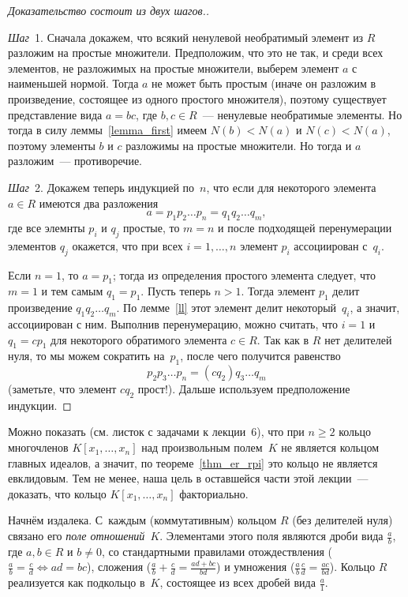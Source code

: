 \documentclass[a4paper,10pt]{amsart}
\theoremstyle{definition}
\theoremstyle{remark}
\begin{document}
\begin{proof}[Доказательство \textup{состоит из двух шагов.}]~

\textit{Шаг}~1. Сначала докажем, что всякий ненулевой необратимый
элемент из $R$ разложим на простые множители. Предположим, что это
не так, и среди всех элементов, не разложимых на простые множители,
выберем элемент $a$ с наименьшей нормой. Тогда $a$ не может быть
простым (иначе он разложим в произведение, состоящее из одного
простого множителя), поэтому существует представление вида $a = bc$,
где $b,c \in R$~--- ненулевые необратимые элементы. Но тогда в силу
леммы~\ref{lemma_first} имеем $N(b) < N(a)$ и $N(c) < N(a)$, поэтому
элементы $b$ и $c$ разложимы на простые множители. Но тогда и $a$
разложим~--- противоречие.

\textit{Шаг}~2. Докажем теперь индукцией по~$n$, что если для
некоторого элемента $a \in R$ имеются два разложения
$$
a = p_1p_2\ldots p_n=q_1q_2\ldots q_m,
$$
где все элемнты $p_i$ и $q_j$ простые, то $m=n$ и после подходящей
перенумерации элементов $q_j$ окажется, что при всех $i = 1,\ldots,
n$ элемент $p_i$ ассоциирован с~$q_i$.

Если $n=1$, то $a = p_1$; тогда из определения простого элемента
следует, что $m = 1$ и тем самым $q_1 = p_1$. Пусть теперь $n > 1$.
Тогда элемент $p_1$ делит произведение $q_1 q_2 \ldots q_m$. По
лемме~\ref{ll} этот элемент делит некоторый~$q_i$, а значит,
ассоциирован с ним. Выполнив перенумерацию, можно считать, что $i =
1$ и $q_1 = cp_1$ для некоторого обратимого элемента $c \in R$. Так
как в $R$ нет делителей нуля, то мы можем сократить на~$p_1$, после
чего получится равенство
$$
p_2 p_3 \ldots p_n = (cq_2)q_3 \ldots q_m
$$
(заметьте, что элемент $cq_2$ прост!). Дальше используем
предположение индукции.
\end{proof}

Можно показать (см. листок с задачами к лекции~6), что при $n
\geqslant 2$ кольцо многочленов $K[x_1, \ldots, x_n]$ над
произвольным полем~$K$ не является кольцом главных идеалов, а
значит, по теореме~\ref{thm_er_rpi} это кольцо не является
евклидовым. Тем не менее, наша цель в оставшейся части этой
лекции~--- доказать, что кольцо $K[x_1, \ldots, x_n]$ факториально.

Начнём издалека. С~каждым (коммутативным) кольцом $R$ (без делителей
нуля) связано его \textit{поле отношений}~$K$. Элементами этого поля
являются дроби вида $\frac{a}{b}$, где $a,b \in R$ и $b\ne 0$, со
стандартными правилами отождествления ($\frac{a}{b} = \frac{c}{d}
\Leftrightarrow ad = bc$), сложения ($\frac{a}{b} + \frac{c}{d} =
\frac{ad+bc}{bd}$) и умножения ($\frac{a}{b}\frac{c}{d} =
\frac{ac}{bd}$). Кольцо $R$ реализуется как подкольцо в~$K$,
состоящее из всех дробей вида $\frac{a}{1}$.
\end{document}
